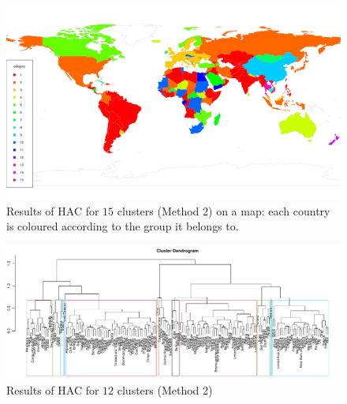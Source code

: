 \documentclass[a4paper,12pt]{article}
\numberwithin{equation}{section}
\begin{document}
\begin{figure}[t!]
\begin{minipage}[t]{0.98\textwidth}
\includegraphics[width=\textwidth]{plots/14days/map_alt_15cl}
\caption{Results of HAC for $15$ clusters (Method 2) on a map: each country is coloured according to the group it belongs to.}\label{fig:map_alt_15cl}
\end{minipage}
\end{figure}

\begin{figure}
\includegraphics[width=\textwidth]{plots/14days/dendrogram_alt}
\caption{Results of HAC for $12$ clusters (Method 2)}\label{fig:dend_alt}
\end{figure}
\end{document}
